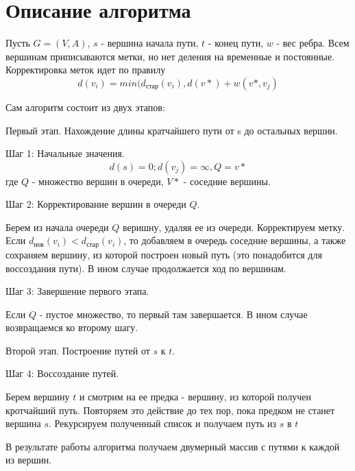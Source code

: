 \documentclass{report}
\begin{document}
\section*{Описание алгоритма}
\par Пусть $G=(V,A)$, $s$ - вершина начала пути, $t$ - конец пути, $w$ - вес ребра. Всем вершинам приписываются метки, но нет деления на временные и постоянные. Корректировка меток идет по правилу $$d(v_i)=min(d_{стар}(v_i), d(v*)+w(v*, v_j)$$
\par Сам алгоритм состоит из двух этапов:
\par Первый этап. Нахождение длины кратчайшего пути от s до остальных вершин.
\par Шаг 1: Начальные значения. $$d(s) = 0; d(v_j)=\infty, Q = {v*}$$
где $Q$ - множество вершин в очереди, $V*$ - соседние вершины.
\par Шаг 2: Корректирование вершин в очереди $Q$.
\par Берем из начала очереди $Q$ веришну, удаляя ее из очереди. Корректируем метку. Если $d_{нов}(v_i)<d_{стар}(v_i)$, то добавляем в очередь соседние вершины, а также сохраняем вершину, из которой построен новый путь (это понадобится для воссоздания пути). В ином случае продолжается ход по вершинам.
\par Шаг 3: Завершение первого этапа.
\par Если $Q$ - пустое множество, то первый там завершается. В ином случае возвращаемся ко второму шагу.
\par Второй этап. Построение путей от $s$ к $t$.
\par Шаг 4: Воссоздание путей.
\par Берем вершину $t$ и смотрим на ее предка - вершину, из которой получен кротчайший путь. Повторяем это действие до тех пор, пока предком не станет вершина $s$. Рекурсируем полученный список и получаем путь из $s$ в $t$
\par В результате работы алгоритма получаем двумерный массив с путями к каждой из вершин.
\newpage

\end{document}
